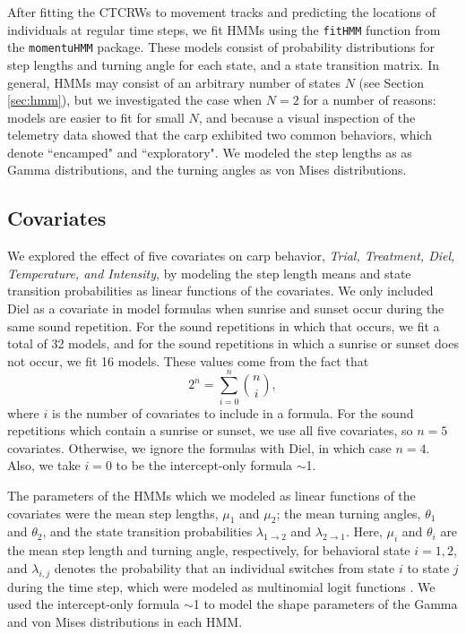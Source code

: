 \documentclass[12pt]{article}
\begin{document}
	After fitting the CTCRWs to movement tracks and predicting the locations of individuals at regular time steps, we fit HMMs using the \texttt{fitHMM} function from the \texttt{momentuHMM} package. These models consist of probability distributions for step lengths and turning angle for each state, and a state transition matrix. In general, HMMs may consist of an arbitrary number of states $N$ (see Section \ref{sec:hmm}), but we investigated the case when $N = 2$ for a number of reasons: models are easier to fit for small $N$, and because a visual inspection of the telemetry data showed that the carp exhibited two common behaviors, which denote ``encamped" and ``exploratory". We modeled the step lengths as as Gamma distributions, and the turning angles as von Mises distributions.
	
	\subsection{Covariates}
	
	We explored the effect of five covariates on carp behavior, \emph{Trial, Treatment, Diel, Temperature, and Intensity}, by modeling the step length means and state transition probabilities as linear functions of the covariates. We only included Diel as a covariate in model formulas when sunrise and sunset occur during the same sound repetition. For the sound repetitions in which that occurs, we fit a total of 32 models, and for the sound repetitions in which a sunrise or sunset does not occur, we fit 16 models. These values come from the fact that
	\[2^n = \sum_{i=0}^n {n \choose i},\]
	where $i$ is the number of covariates to include in a formula. For the sound repetitions which contain a sunrise or sunset, we use all five covariates, so $n = 5$ covariates. Otherwise, we ignore the formulas with Diel, in which case $n = 4$. Also, we take $i = 0$ to be the intercept-only formula $\sim$1.
	
	The parameters of the HMMs which we modeled as linear functions of the covariates were the mean step lengths, $\mu_1$ and $\mu_2$; the mean turning angles, $\theta_1$ and $\theta_2$, and the state transition probabilities $\lambda_{1 \to 2}$ and $\lambda_{2 \to 1}$. Here, $\mu_i$ and $\theta_i$ are the mean step length and turning angle, respectively, for behavioral state $i = 1, 2$, and $\lambda_{i, j}$ denotes the probability that an individual switches from state $i$ to state $j$ during the time step, which were modeled as multinomial logit functions \cite{Michelot2016}. We used the intercept-only formula $\sim$1 to model the shape parameters of the Gamma and von Mises distributions in each HMM.
	
\end{document}
